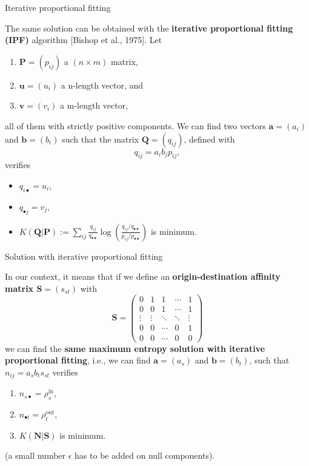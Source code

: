 \documentclass[10pt]{beamer}
\newcommand{\imp}[1]{\textbf{\color{cyan}#1}}
\begin{document}
	
	\begin{frame}{Iterative proportional fitting}
	
	The same solution can be obtained with the \imp{iterative proportional fitting (IPF)} algorithm [Bishop et al., 1975]. Let 
	\begin{enumerate}
		\item $\mathbf{P} = (p_{ij})$ a $(n \times m)$ matrix, 
		\item $\mathbf{u} = (u_i)$ a n-length vector, and 
		\item $\mathbf{v} = (v_i)$ a m-length vector,
	\end{enumerate}
	all of them with strictly positive components. We can find two vectors $\mathbf{a} = (a_i)$ and $\mathbf{b} = (b_i)$ such that the matrix $\mathbf{Q} = (q_{ij})$, defined with
	$$
		q_{ij} = a_i b_j p_{ij},
	$$
	verifies
	\begin{itemize}
		\item $q_{i\bullet} = u_i$,
		\item $q_{\bullet j} = v_j$,
		\item $K(\mathbf{Q}| \mathbf{P}) := \sum_{ij} \frac{q_{ij}}{q_{\bullet \bullet}} \log \left( \frac{q_{ij} / q_{\bullet \bullet}}{p_{ij} / p_{\bullet \bullet}} \right)$ is minimum.
	\end{itemize}
	\end{frame}
	
	
	\begin{frame}{Solution with iterative proportional fitting}
		
		In our context, it means that if we define an \imp{origin-destination affinity matrix $\mathbf{S} = (s_{st})$} with 
			$$
				\mathbf{S} = \left( \begin{array}{ccccc}
				0 & 1 & 1 & \cdots & 1 \\
				0 & 0 & 1 & \cdots & 1 \\
				\vdots & \vdots & \ddots & \ddots & \vdots \\
				0 & 0 & \cdots & 0 & 1 \\
				0 & 0 & \cdots & 0 & 0 
				\end{array} \right)
			$$
		we can find the \imp{same maximum entropy solution with iterative proportional fitting}, i.e., we can find $\mathbf{a} = (a_s)$ and $\mathbf{b} = (b_t)$, such that $n_{ij} = a_s b_t s_{st}$ verifies
		\begin{enumerate}
			\item $n_{s\bullet} = \rho^\text{in}_s$,
			\item $n_{\bullet t} = \rho^\text{out}_t$,
			\item $K(\mathbf{N}| \mathbf{S})$ is minimum.
		\end{enumerate}
		\small (a small number $\epsilon$ has to be added on null components).
	\end{frame}
	
\end{document}
